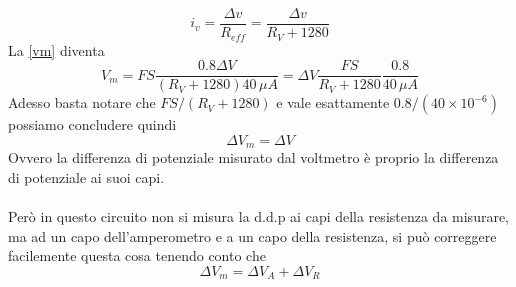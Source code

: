 \documentclass[12pt]{article}
\begin{document}
\begin{equation}
i_v = \frac{\Delta v}{R_{eff}} = \frac{\Delta v}{R_{V}+1280}
\end{equation}
La \eqref{vm} diventa
\begin{equation}
V_m = FS\frac{0.8\Delta V}{(R_V+1280)40\,\mu A} = \Delta V\frac{FS}{R_V+1280}\frac{0.8}{40\,\mu A}
\end{equation}
Adesso basta notare che $FS/ (R_V+1280)$ e vale esattamente $0.8/(40\times 10^{-6})$ possiamo concludere quindi
\begin{equation}
\Delta V_m = \Delta V
\end{equation}
Ovvero la differenza di potenziale misurato dal voltmetro è proprio la differenza di potenziale ai suoi capi.\\
\\Però in questo circuito non si misura la d.d.p ai capi della resistenza da misurare, ma ad un capo dell'amperometro e a un capo della resistenza, si può correggere facilemente questa cosa tenendo conto che
\begin{equation}
\Delta V_m = \Delta V_A + \Delta V_R
\end{equation}
\end{document}
